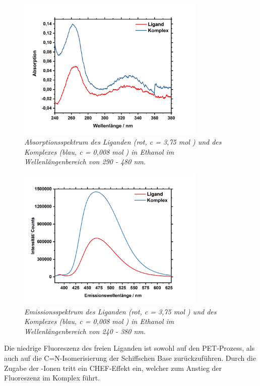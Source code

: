 \documentclass[12pt,a4paper]{report}
\begin{document}
	\newpage 
		\begin{figure}[h!]
			\centering 
			\includegraphics[width=0.8\textwidth]{UVVIsLigandKomplex.jpg}
			\caption{\textnormal{\textit{Absorptionsspektrum des Liganden (rot, c = 3,75 \textmu mol ) und des Komplexes (blau, c = 0,008 \textmu mol ) in Ethanol im Wellenlängenbereich von 290 - 480 nm.}}}
			\label{fig:UVVISLigandKomplex}
		\end{figure}
		\begin{figure}[h!]
			\centering 
			\includegraphics[width=0.8\textwidth]{FluoreszenzLigandKomplex.jpg}
			\caption{\textnormal{\textit{Emissionsspektrum des Liganden (rot, c = 3,75 \textmu mol ) und des Komplexes (blau, c = 0,008 \textmu mol ) in Ethanol im Wellenlängenbereich von 240 - 380 nm.}}}
			\label{fig:FluoreszenzLigandKomplex}
		\end{figure}
	\newpage 
	\noindent Die niedrige Fluoreszenz des freien Liganden ist sowohl auf den PET-Prozess, als auch auf die C=N-Isomerisierung der Schiffschen Base zurückzuführen. Durch die Zugabe der -Ionen tritt ein CHEF-Effekt ein, welcher zum Anstieg der Fluoreszenz im Komplex führt. 
\end{document}
